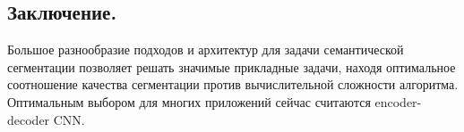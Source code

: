 \documentclass{article}
\begin{document}
\subsection{Заключение.}
Большое разнообразие подходов и архитектур для задачи семантической сегментации позволяет решать значимые прикладные задачи, находя оптимальное соотношение качества сегментации против вычислительной сложности алгоритма. Оптимальным выбором для многих приложений сейчас считаются encoder-decoder CNN.



\end{document}
